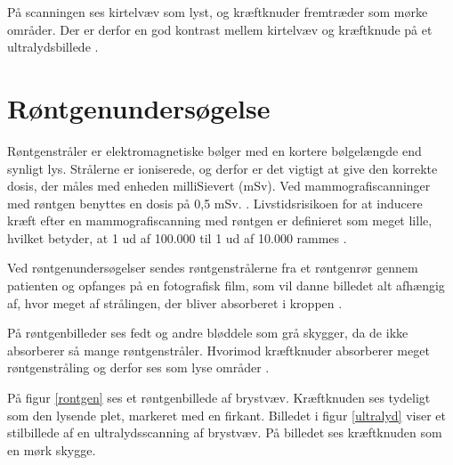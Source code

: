 På scanningen ses kirtelvæv som lyst, og kræftknuder fremtræder som mørke områder.  Der er derfor en god kontrast mellem kirtelvæv og kræftknude på et ultralydsbillede \citep{Ultralyd}.

\section{Røntgenundersøgelse}
Røntgenstråler er elektromagnetiske bølger med en kortere bølgelængde end synligt lys. Strålerne er ioniserede, og derfor er det vigtigt at give den korrekte dosis, der måles med enheden milliSievert (mSv). Ved mammografiscanninger med røntgen benyttes en dosis på 0,5 mSv. \cite{Sundhedsstyrelsen}. Livstidsrisikoen for at inducere kræft efter en mammografiscanning med røntgen er definieret som meget lille, hvilket betyder, at 1 ud af 100.000 til 1 ud af 10.000 rammes \cite{Risk}. 

Ved røntgenundersøgelser sendes røntgenstrålerne fra et røntgenrør gennem patienten og opfanges på en fotografisk film, som vil danne billedet alt afhængig af, hvor meget af strålingen, der bliver absorberet i kroppen \cite{Rontgenundersogelse}.

På røntgenbilleder ses fedt og andre bløddele som grå skygger, da de ikke absorberer så mange røntgenstråler. Hvorimod kræftknuder absorberer meget røntgenstråling og derfor ses som lyse områder \cite{Rontgenundersogelse}.

På figur \ref{rontgen} ses et røntgenbillede af brystvæv. Kræftknuden ses tydeligt som den lysende plet, markeret med en firkant. Billedet i figur \ref{ultralyd} viser et stilbillede af en ultralydsscanning af brystvæv. På billedet ses kræftknuden som en mørk skygge. 

